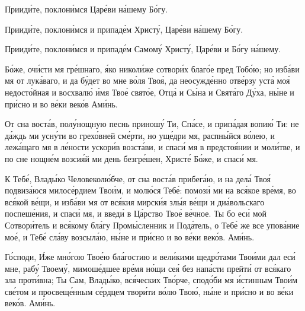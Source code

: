 \begin{mymulticols}
Приид\'{и}те, поклон\'{и}мся Цар\'{е}ви н\'{а}шему Б\'{о}гу. 

Приид\'{и}те, поклон\'{и}мся и припад\'{е}м Христ\'{у}, Цар\'{е}ви н\'{а}шему Б\'{о}гу. 

Приид\'{и}те, поклон\'{и}мся и припад\'{е}м Самом\'{у} Христ\'{у}, Цар\'{е}ви и Б\'{о}гу н\'{а}шему. 


\PsalmFifty


\SymbolOfFaith


Б\'{о}же, оч\'{и}сти мя гр\'{е}шнаго, \'{я}ко никол\'{и}же сотвор\'{и}х благ\'{о}е пред Тоб\'{о}ю; но изб\'{а}ви мя от лук\'{а}ваго, и да б\'{у}дет во мне в\'{о}ля Тво\'{я}, да неосужд\'{е}нно отв\'{е}рзу уст\'{а} мо\'{я} недост\'{о}йная и восхвал\'{ю} \'{и}мя Тво\'{е} свят\'{о}е, Отц\'{а} и С\'{ы}на и Свят\'{а}го Д\'{у}ха, н\'{ы}не и пр\'{и}сно и во в\'{е}ки век\'{о}в Ам\'{и}нь.


От сна вост\'{а}в, пол\'{у}нощную песнь принош\'{у} Ти, Сп\'{а}се, и прип\'{а}дая вопи\'{ю} Ти: не д\'{а}ждь ми усн\'{у}ти во грех\'{о}вней см\'{е}рти, но ущ\'{е}дри мя, распн\'{ы}йся в\'{о}лею, и леж\'{а}щаго мя в л\'{е}ности ускор\'{и}в возст\'{а}ви, и спас\'{и} мя в предсто\'{я}нии и мол\'{и}тве, и по сне нощн\'{е}м возси\'{я}й ми день безгр\'{е}шен, Христ\'{е} Б\'{о}же, и спас\'{и} мя.


К Теб\'{е}, Влад\'{ы}ко Человекол\'{ю}бче, от сна вост\'{а}в прибег\'{а}ю, и на дел\'{а} Тво\'{я} подвиз\'{а}юся милос\'{е}рдием Тво\'{и}м, и мол\'{ю}ся Теб\'{е}: помоз\'{и} ми на вс\'{я}кое вр\'{е}мя, во вс\'{я}кой в\'{е}щи, и изб\'{а}ви мя от вс\'{я}кия мирск\'{и}я зл\'{ы}я в\'{е}щи и ди\'{а}вольскаго поспеш\'{е}ния, и спас\'{и} мя, и введ\'{и} в Ц\'{а}рство Тво\'{е} в\'{е}чное. Ты бо ес\'{и} мой Сотвор\'{и}тель и вс\'{я}кому бл\'{а}гу Пром\'{ы}сленник и Под\'{а}тель, о Теб\'{е} же все упов\'{а}ние мо\'{е}, и Теб\'{е} сл\'{а}ву возсыл\'{а}ю, н\'{ы}не и пр\'{и}сно и во в\'{е}ки век\'{о}в. Ам\'{и}нь.


Г\'{о}споди, \'{И}же мн\'{о}гою Тво\'{е}ю бл\'{а}гостию и вел\'{и}кими щедр\'{о}тами Тво\'{и}ми дал ес\'{и} мне, раб\'{у} Твоем\'{у}, мимош\'{е}дшее вр\'{е}мя н\'{о}щи се\'{я} без нап\'{а}сти прейт\'{и} от вс\'{я}каго зла прот\'{и}вна; Ты Сам, Влад\'{ы}ко, вс\'{я}ческих Тв\'{о}рче, спод\'{о}би мя \'{и}стинным Тво\'{и}м св\'{е}том и просвещ\'{е}нным с\'{е}рдцем твор\'{и}ти в\'{о}лю Тво\'{ю}, н\'{ы}не и пр\'{и}сно и во в\'{е}ки век\'{о}в. Ам\'{и}нь.


\end{mymulticols}
